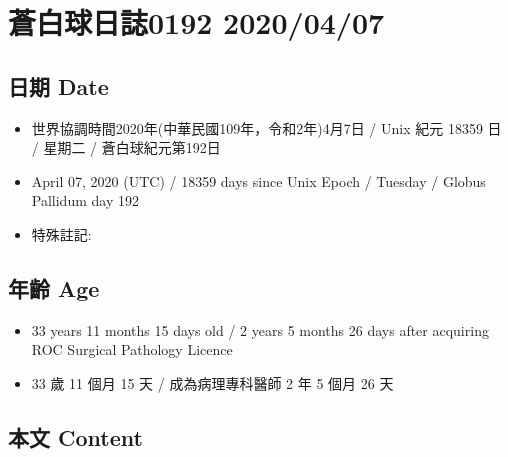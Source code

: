 \documentclass[
]{article}
\providecommand{\tightlist}{%
  \setlength{\itemsep}{0pt}\setlength{\parskip}{0pt}}
\begin{document}
\hypertarget{ux84bcux767dux7403ux65e5ux8a8c0192-20200407}{%
\section{蒼白球日誌0192
2020/04/07}\label{ux84bcux767dux7403ux65e5ux8a8c0192-20200407}}

\hypertarget{ux65e5ux671f-date-6}{%
\subsection{日期 Date}\label{ux65e5ux671f-date-6}}

\begin{itemize}
\tightlist
\item
  世界協調時間2020年(中華民國109年，令和2年)4月7日 / Unix 紀元 18359 日
  / 星期二 / 蒼白球紀元第192日
\item
  April 07, 2020 (UTC) / 18359 days since Unix Epoch / Tuesday / Globus
  Pallidum day 192
\item
  特殊註記:
\end{itemize}

\hypertarget{ux5e74ux9f61-age-6}{%
\subsection{年齡 Age}\label{ux5e74ux9f61-age-6}}

\begin{itemize}
\tightlist
\item
  33 years 11 months 15 days old / 2 years 5 months 26 days after
  acquiring ROC Surgical Pathology Licence
\item
  33 歲 11 個月 15 天 / 成為病理專科醫師 2 年 5 個月 26 天
\end{itemize}

\hypertarget{ux672cux6587-content-6}{%
\subsection{本文 Content}\label{ux672cux6587-content-6}}
\end{document}
